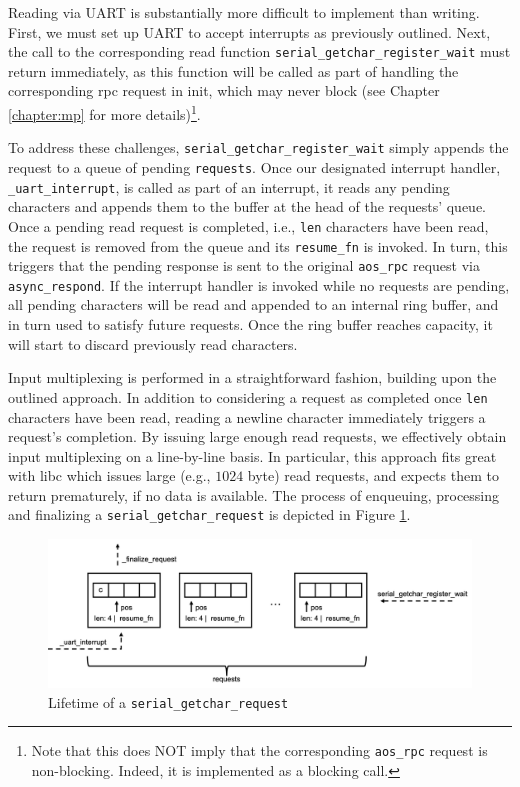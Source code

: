 Reading via UART is substantially more difficult to implement than writing. First, we must set up UART to accept interrupts as previously outlined. Next, the call to the corresponding read function \texttt{serial\_getchar\_register\_wait} must return immediately, as this function will be called as part of handling the corresponding rpc request in init, which may never block (see Chapter \ref{chapter:mp} for more details)\footnote{Note that this does NOT imply that the corresponding \texttt{aos\_rpc} request is non-blocking. Indeed, it is implemented as a blocking call.}.

To address these challenges, \texttt{serial\_getchar\_register\_wait} simply appends the request to a queue of pending \texttt{requests}. Once our designated interrupt handler, \texttt{\_uart\_interrupt}, is called as part of an interrupt, it reads any pending characters and appends them to the buffer at the head of the requests' queue. Once a pending read request is completed, i.e., \texttt{len} characters have been read, the request is removed from the queue and its \texttt{resume\_fn} is invoked. In turn, this triggers that the pending response is sent to the original \texttt{aos\_rpc} request via \texttt{async\_respond}. If the interrupt handler is invoked while no requests are pending, all pending characters will be read and appended to an internal ring buffer, and in turn used to satisfy future requests. Once the ring buffer reaches capacity, it will start to discard previously read characters.

Input multiplexing is performed in a straightforward fashion, building upon the outlined approach. In addition to considering a request as completed once \texttt{len} characters have been read, reading a newline character immediately triggers a request's completion. By issuing large enough read requests, we effectively obtain input multiplexing on a line-by-line basis. In particular, this approach fits great with libc which issues large (e.g., $1024$ byte) read requests, and expects them to return prematurely, if no data is available. The process of enqueuing, processing and finalizing a \texttt{serial\_getchar\_request} is depicted in Figure \ref{fig:serial_read}.

\begin{figure}[htp]
    \centering
    \includegraphics[width=12cm]{images/serial/serial_read.png}
    \caption{Lifetime of a \texttt{serial\_getchar\_request}}
    \label{fig:serial_read}
\end{figure}

